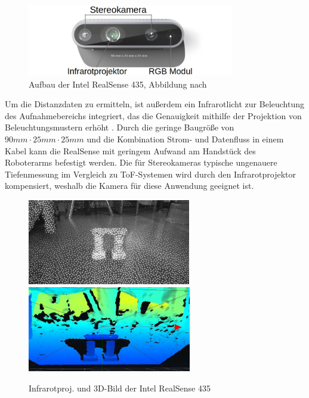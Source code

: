 \begin{figure}[ht]
    \centering
    \includegraphics[width=9cm]{Bilder/realsense_aufbau.jpg}
    \caption{Aufbau der Intel RealSense 435, Abbildung nach \cite{intel_corporation_depth_2022}}
    \label{fig:realsense_aufbau}
\end{figure}

Um die Distanzdaten zu ermitteln, ist außerdem ein Infrarotlicht zur Beleuchtung des Aufnahmebereichs integriert, das die Genauigkeit mithilfe der Projektion von Beleuchtungsmustern erhöht . Durch die geringe Baugröße von $90mm \cdot 25mm \cdot 25mm$ und die Kombination Strom- und Datenfluss in einem Kabel kann die RealSense mit geringem Aufwand am Handstück des Roboterarms befestigt werden. Die für Stereokameras typische ungenauere Tiefenmessung im Vergleich zu \ac{ToF}-Systemen wird durch den Infrarotprojektor kompensiert, weshalb die Kamera für diese Anwendung geeignet ist. 

\begin{figure}[ht]
    \centering
    \includegraphics[width=7.12cm]{Bilder/realsense_infrarot.jpg}
    \includegraphics[width=7.14cm]{Bilder/realsense_3d.jpg}
    \caption{Infrarotproj. und 3D-Bild der Intel RealSense 435}
    \label{fig:realsense_infrarot}
\end{figure}

